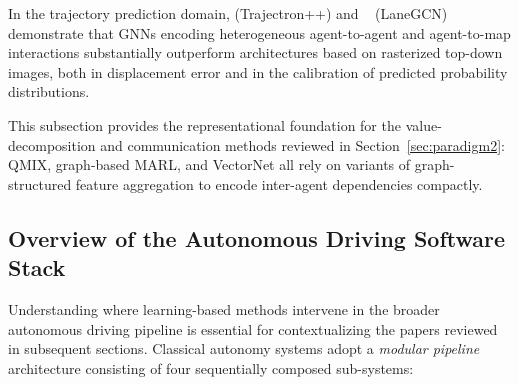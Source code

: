 \documentclass[12pt, a4paper]{article}
\begin{document}
In the trajectory prediction domain, \citeauthor{salzmann2020trajectron}
\cite{salzmann2020trajectron} (Trajectron++) and
\citeauthor{liang2020lanegcn}~\cite{liang2020lanegcn} (LaneGCN) demonstrate
that GNNs encoding heterogeneous agent-to-agent and agent-to-map interactions
substantially outperform architectures based on rasterized top-down images,
both in displacement error and in the calibration of predicted probability
distributions.

This subsection provides the representational foundation for the
value-decomposition and communication methods reviewed in
Section~\ref{sec:paradigm2}: QMIX, graph-based MARL, and VectorNet all rely
on variants of graph-structured feature aggregation to encode inter-agent
dependencies compactly.

\subsection{Overview of the Autonomous Driving Software Stack}
\label{sec:ad_stack}

Understanding where learning-based methods intervene in the broader autonomous
driving pipeline is essential for contextualizing the papers reviewed in
subsequent sections.  Classical autonomy systems adopt a \emph{modular
pipeline} architecture consisting of four sequentially composed sub-systems:
\end{document}
